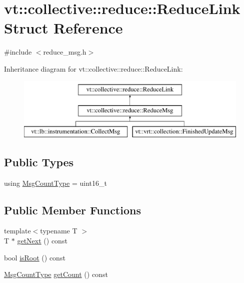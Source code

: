 \hypertarget{structvt_1_1collective_1_1reduce_1_1_reduce_link}{}\section{vt\+:\+:collective\+:\+:reduce\+:\+:Reduce\+Link Struct Reference}
\label{structvt_1_1collective_1_1reduce_1_1_reduce_link}


{\ttfamily \#include $<$reduce\+\_\+msg.\+h$>$}

Inheritance diagram for vt\+:\+:collective\+:\+:reduce\+:\+:Reduce\+Link\+:\begin{figure}[H]
\begin{center}
\leavevmode
\includegraphics[height=3.000000cm]{structvt_1_1collective_1_1reduce_1_1_reduce_link}
\end{center}
\end{figure}
\subsection*{Public Types}
\begin{DoxyCompactItemize}
\item 
using \hyperlink{structvt_1_1collective_1_1reduce_1_1_reduce_link_a041d928748b444f18ea3ddb72fdbe08a}{Msg\+Count\+Type} = uint16\+\_\+t
\end{DoxyCompactItemize}
\subsection*{Public Member Functions}
\begin{DoxyCompactItemize}
\item 
{\footnotesize template$<$typename T $>$ }\\T $\ast$ \hyperlink{structvt_1_1collective_1_1reduce_1_1_reduce_link_a5f2fa0112fe80ef48b561e2208f92096}{get\+Next} () const
\item 
bool \hyperlink{structvt_1_1collective_1_1reduce_1_1_reduce_link_ac7acf00f0be6c8e12bdf4f5ad2268c3e}{is\+Root} () const
\item 
\hyperlink{structvt_1_1collective_1_1reduce_1_1_reduce_link_a041d928748b444f18ea3ddb72fdbe08a}{Msg\+Count\+Type} \hyperlink{structvt_1_1collective_1_1reduce_1_1_reduce_link_ad182794660d06139bbc59f85151cb27b}{get\+Count} () const
\end{DoxyCompactItemize}
